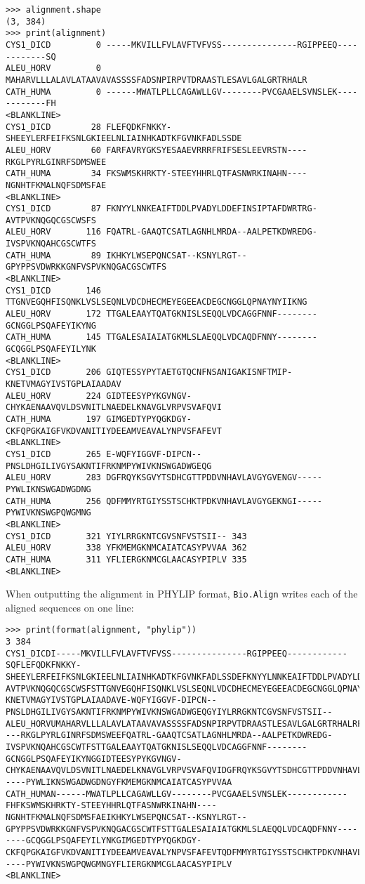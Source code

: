 \begin{verbatim}
>>> alignment.shape
(3, 384)
>>> print(alignment)
CYS1_DICD         0 -----MKVILLFVLAVFTVFVSS---------------RGIPPEEQ------------SQ
ALEU_HORV         0 MAHARVLLLALAVLATAAVAVASSSSFADSNPIRPVTDRAASTLESAVLGALGRTRHALR
CATH_HUMA         0 ------MWATLPLLCAGAWLLGV--------PVCGAAELSVNSLEK------------FH
<BLANKLINE>
CYS1_DICD        28 FLEFQDKFNKKY-SHEEYLERFEIFKSNLGKIEELNLIAINHKADTKFGVNKFADLSSDE
ALEU_HORV        60 FARFAVRYGKSYESAAEVRRRFRIFSESLEEVRSTN----RKGLPYRLGINRFSDMSWEE
CATH_HUMA        34 FKSWMSKHRKTY-STEEYHHRLQTFASNWRKINAHN----NGNHTFKMALNQFSDMSFAE
<BLANKLINE>
CYS1_DICD        87 FKNYYLNNKEAIFTDDLPVADYLDDEFINSIPTAFDWRTRG-AVTPVKNQGQCGSCWSFS
ALEU_HORV       116 FQATRL-GAAQTCSATLAGNHLMRDA--AALPETKDWREDG-IVSPVKNQAHCGSCWTFS
CATH_HUMA        89 IKHKYLWSEPQNCSAT--KSNYLRGT--GPYPPSVDWRKKGNFVSPVKNQGACGSCWTFS
<BLANKLINE>
CYS1_DICD       146 TTGNVEGQHFISQNKLVSLSEQNLVDCDHECMEYEGEEACDEGCNGGLQPNAYNYIIKNG
ALEU_HORV       172 TTGALEAAYTQATGKNISLSEQQLVDCAGGFNNF--------GCNGGLPSQAFEYIKYNG
CATH_HUMA       145 TTGALESAIAIATGKMLSLAEQQLVDCAQDFNNY--------GCQGGLPSQAFEYILYNK
<BLANKLINE>
CYS1_DICD       206 GIQTESSYPYTAETGTQCNFNSANIGAKISNFTMIP-KNETVMAGYIVSTGPLAIAADAV
ALEU_HORV       224 GIDTEESYPYKGVNGV-CHYKAENAAVQVLDSVNITLNAEDELKNAVGLVRPVSVAFQVI
CATH_HUMA       197 GIMGEDTYPYQGKDGY-CKFQPGKAIGFVKDVANITIYDEEAMVEAVALYNPVSFAFEVT
<BLANKLINE>
CYS1_DICD       265 E-WQFYIGGVF-DIPCN--PNSLDHGILIVGYSAKNTIFRKNMPYWIVKNSWGADWGEQG
ALEU_HORV       283 DGFRQYKSGVYTSDHCGTTPDDVNHAVLAVGYGVENGV-----PYWLIKNSWGADWGDNG
CATH_HUMA       256 QDFMMYRTGIYSSTSCHKTPDKVNHAVLAVGYGEKNGI-----PYWIVKNSWGPQWGMNG
<BLANKLINE>
CYS1_DICD       321 YIYLRRGKNTCGVSNFVSTSII-- 343
ALEU_HORV       338 YFKMEMGKNMCAIATCASYPVVAA 362
CATH_HUMA       311 YFLIERGKNMCGLAACASYPIPLV 335
<BLANKLINE>
\end{verbatim}
When outputting the alignment in PHYLIP format, \verb|Bio.Align| writes each of the aligned sequences on one line:
\begin{verbatim}
>>> print(format(alignment, "phylip"))
3 384
CYS1_DICDI-----MKVILLFVLAVFTVFVSS---------------RGIPPEEQ------------SQFLEFQDKFNKKY-SHEEYLERFEIFKSNLGKIEELNLIAINHKADTKFGVNKFADLSSDEFKNYYLNNKEAIFTDDLPVADYLDDEFINSIPTAFDWRTRG-AVTPVKNQGQCGSCWSFSTTGNVEGQHFISQNKLVSLSEQNLVDCDHECMEYEGEEACDEGCNGGLQPNAYNYIIKNGGIQTESSYPYTAETGTQCNFNSANIGAKISNFTMIP-KNETVMAGYIVSTGPLAIAADAVE-WQFYIGGVF-DIPCN--PNSLDHGILIVGYSAKNTIFRKNMPYWIVKNSWGADWGEQGYIYLRRGKNTCGVSNFVSTSII--
ALEU_HORVUMAHARVLLLALAVLATAAVAVASSSSFADSNPIRPVTDRAASTLESAVLGALGRTRHALRFARFAVRYGKSYESAAEVRRRFRIFSESLEEVRSTN----RKGLPYRLGINRFSDMSWEEFQATRL-GAAQTCSATLAGNHLMRDA--AALPETKDWREDG-IVSPVKNQAHCGSCWTFSTTGALEAAYTQATGKNISLSEQQLVDCAGGFNNF--------GCNGGLPSQAFEYIKYNGGIDTEESYPYKGVNGV-CHYKAENAAVQVLDSVNITLNAEDELKNAVGLVRPVSVAFQVIDGFRQYKSGVYTSDHCGTTPDDVNHAVLAVGYGVENGV-----PYWLIKNSWGADWGDNGYFKMEMGKNMCAIATCASYPVVAA
CATH_HUMAN------MWATLPLLCAGAWLLGV--------PVCGAAELSVNSLEK------------FHFKSWMSKHRKTY-STEEYHHRLQTFASNWRKINAHN----NGNHTFKMALNQFSDMSFAEIKHKYLWSEPQNCSAT--KSNYLRGT--GPYPPSVDWRKKGNFVSPVKNQGACGSCWTFSTTGALESAIAIATGKMLSLAEQQLVDCAQDFNNY--------GCQGGLPSQAFEYILYNKGIMGEDTYPYQGKDGY-CKFQPGKAIGFVKDVANITIYDEEAMVEAVALYNPVSFAFEVTQDFMMYRTGIYSSTSCHKTPDKVNHAVLAVGYGEKNGI-----PYWIVKNSWGPQWGMNGYFLIERGKNMCGLAACASYPIPLV
<BLANKLINE>
\end{verbatim}
